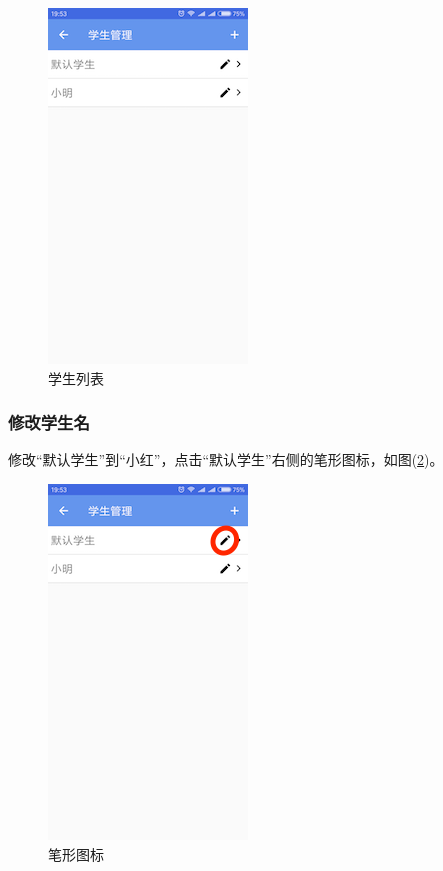 \begin{figure}[H]
	\centering
	\includegraphics{img/10.png}
	\caption{学生列表}
	\label{img10}
\end{figure}

\subsubsection{修改学生名}
修改“默认学生”到“小红”，点击“默认学生”右侧的笔形图标，如图(\ref{img11})。
\begin{figure}[H]
	\centering
	\includegraphics{img/11.png}
	\caption{笔形图标}
	\label{img11}
\end{figure}

